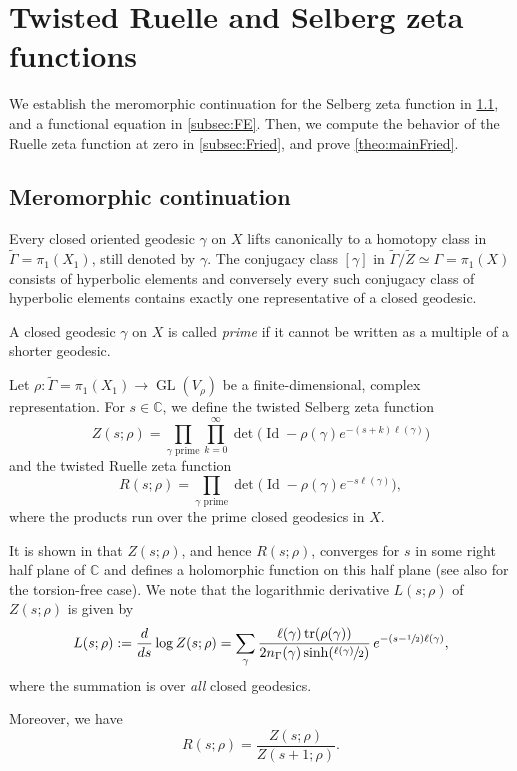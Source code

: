 \documentclass[JEP,XML,SOM,Unicode,NoFloatCountersInSection,published]{cedram}
\theoremstyle{plain}
\theoremstyle{definition}
\theoremstyle{remark}
\newcommand{\C}{\mathbb{C}}
\DeclareMathOperator{\GL}{GL}
\DeclareMathOperator{\tr}{tr}
\DeclareMathOperator{\Id}{Id}
\numberwithin{equation}{section}
\begin{document}
\section{Twisted Ruelle and Selberg zeta functions}
\label{sec:Ruelle}
We establish the meromorphic continuation for the Selberg zeta function in \cref{subsec:mero}, and a functional equation in \cref{subsec:FE}. Then, we compute the behavior of the Ruelle zeta function at zero in \cref{subsec:Fried}, and prove \cref{theo:mainFried}.

\subsection{Meromorphic continuation}
\label{subsec:mero}

Every closed oriented geodesic $\gamma$ on $X$ lifts canonically to a homotopy class in $\widetilde{\Gamma}=\pi_1(X_1)$, still denoted by $\gamma$. The conjugacy class $[\gamma]$ in $\widetilde{\Gamma}/\widetilde{Z}\simeq\Gamma=\pi_1(X)$ consists of hyperbolic elements and conversely every such conjugacy class of hyperbolic elements contains exactly one representative of a closed geodesic.

A closed geodesic $\gamma$ on $X$ is called \emph{prime} if it cannot be written as a multiple of a shorter geodesic.

Let $\rho:\widetilde{\Gamma}=\pi_1(X_1)\to\GL(V_\rho)$ be a finite-dimensional, complex representation. For $s\in\C$, we define the twisted Selberg zeta function
\[
Z(s;\rho) = \prod_{\gamma\text{ prime}}\prod_{k=0}^\infty\det\bigl(\Id-\rho(\gamma)e^{-(s+k)\ell(\gamma)}\bigr)
\]
and the twisted Ruelle zeta function
\[
R(s;\rho) = \prod_{\gamma\text{ prime}}\det\bigl(\Id-\rho(\gamma)e^{-s\ell(\gamma)}\bigr),
\]
where the products run over the prime closed geodesics in $X$.

It is shown in \cite[Th.\,3.1]{fedosova2020meromorphic} that $Z(s;\rho)$, and hence $R(s;\rho)$, converges for $s$ in some right half plane of $\C$ and defines a holomorphic function on this half plane (see also \cite[\S 1.2]{Wo} for the torsion-free case). We note that the logarithmic derivative
$L(s;\rho)$ of $Z(s;\rho)$ is given by
\[
L(s;\rho):= \frac{d}{ds}\log Z(s;\rho) = \sum_\gamma\frac{\ell(\gamma)\tr(\rho(\gamma))}{2n_\Gamma(\gamma)\sinh(\sfrac{\ell(\gamma)}{2})}\,e^{-(s-\sfrac{1}{2})\ell(\gamma)},
\]
where the summation is over \emph{all} closed geodesics.

Moreover, we have
\begin{equation}
\label{eq:RuelSel} R(s;\rho) = \frac{Z(s;\rho)}{Z(s+1;\rho)}.
\end{equation}
\end{document}
